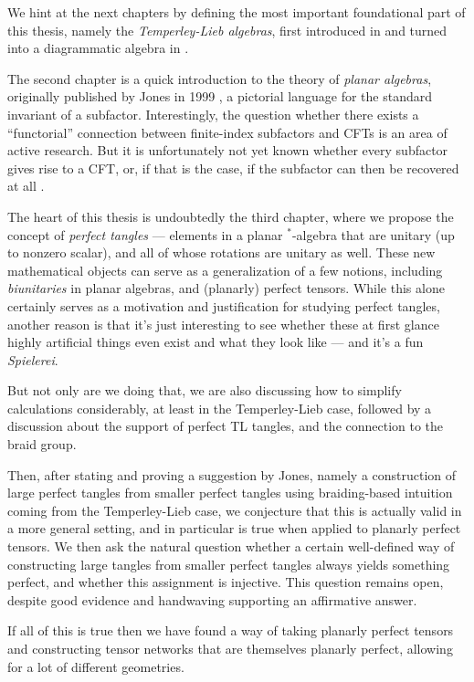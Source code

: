 We hint at the next chapters by defining the most important foundational part of this thesis, namely the \emph{Temperley-Lieb algebras}, first introduced in \cite{temperley1971relations} and turned into a diagrammatic algebra in \cite{kauffman1987state}.

\bigskip
The second chapter is a quick introduction to the theory of \emph{planar algebras}, originally published by Jones in 1999 \cite{jones1999planar1}, a pictorial language for the standard invariant of a subfactor. Interestingly, the question whether there exists a ``functorial'' connection between finite-index subfactors and CFTs is an area of active research. But it is unfortunately not yet known whether every subfactor gives rise to a CFT, or, if that is the case, if the subfactor can then be recovered at all \cite{oberwolfach}.

\bigskip
The heart of this thesis is undoubtedly the third chapter, where we propose the concept of \emph{perfect tangles} --- elements in a planar ${}^*$-algebra that are unitary (up to nonzero scalar), and all of whose rotations are unitary as well. These new mathematical objects can serve as a generalization of a few notions, including \emph{biunitaries} in planar algebras, and (planarly) perfect tensors. While this alone certainly serves as a motivation and justification for studying perfect tangles, another reason is that it's just interesting to see whether these at first glance highly artificial things even exist and what they look like --- and it's a fun \emph{Spielerei}.

But not only are we doing that, we are also discussing how to simplify calculations considerably, at least in the Temperley-Lieb case, followed by a discussion about the support of perfect TL tangles, and the connection to the braid group. 

Then, after stating and proving a suggestion by Jones, namely a construction of large perfect tangles from smaller perfect tangles using braiding-based intuition coming from the Temperley-Lieb case, we conjecture that this is actually valid in a more general setting, and in particular is true when applied to planarly perfect tensors. We then ask the natural question whether a certain well-defined way of constructing large tangles from smaller perfect tangles always yields something perfect, and whether this assignment is injective. This question remains open, despite good evidence and handwaving supporting an affirmative answer.

If all of this is true then we have found a way of taking planarly perfect tensors and constructing tensor networks that are themselves planarly perfect, allowing for a lot of different geometries.

